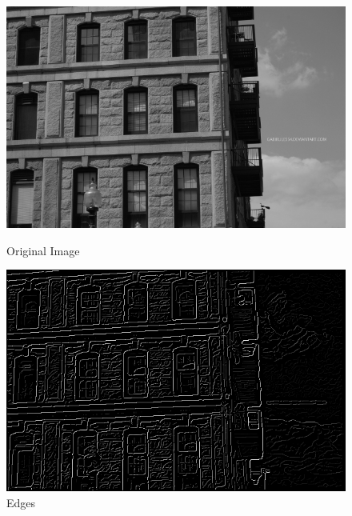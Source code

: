 \begin{figure}[H]
  \centering
  \begin{minipage}{0.4\textwidth}
    \includegraphics[width=\textwidth]{images/08-example-original.jpg}
    \caption{Original Image}
    \label{fig:08-original}
  \end{minipage}
  \begin{minipage}{0.4\textwidth}
    \includegraphics[width=\textwidth]{images/08-example-edges.png}
    \caption{Edges}
    \label{fig:08-edges}
  \end{minipage}
  \begin{minipage}{0.4\textwidth}

\end{minipage}
\end{figure}
